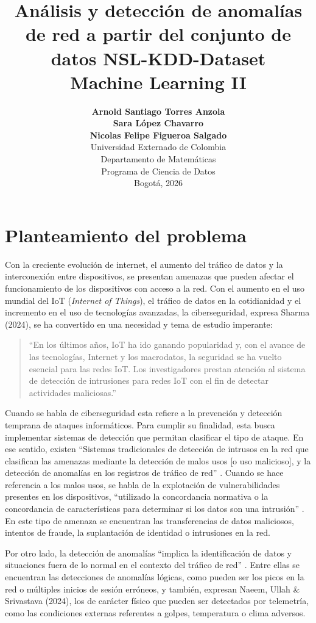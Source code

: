 \documentclass[12pt,a4paper]{article}
\title{\textbf{\Large Análisis y detección de anomalías de red a partir del conjunto de datos NSL-KDD-Dataset} \\
\vspace{0.3cm}
\large Machine Learning II}
\author{
    \textbf{Arnold Santiago Torres Anzola} \\
    \textbf{Sara López Chavarro} \\
    \textbf{Nicolas Felipe Figueroa Salgado} \\[0.4cm]
    \small Universidad Externado de Colombia \\
    \small Departamento de Matemáticas \\
    \small Programa de Ciencia de Datos \\
    \small Bogotá, 2026
}
\date{}
\begin{document}
\maketitle

\vspace{0.5cm}

\section{Planteamiento del problema}

Con la creciente evolución de internet, el aumento del tráfico de datos y la interconexión entre dispositivos, se presentan amenazas que pueden afectar el funcionamiento de los dispositivos con acceso a la red. Con el aumento en el uso mundial del IoT (\textit{Internet of Things}), el tráfico de datos en la cotidianidad y el incremento en el uso de tecnologías avanzadas, la ciberseguridad, expresa Sharma (2024), se ha convertido en una necesidad y tema de estudio imperante:

\begin{quote}
``En los últimos años, IoT ha ido ganando popularidad y, con el avance de las tecnologías, Internet y los macrodatos, la seguridad se ha vuelto esencial para las redes IoT. Los investigadores prestan atención al sistema de detección de intrusiones para redes IoT con el fin de detectar actividades maliciosas.'' \cite[pág.~1]{sharma2024explainable}
\end{quote}

Cuando se habla de ciberseguridad esta refiere a la prevención y detección temprana de ataques informáticos. Para cumplir su finalidad, esta busca implementar sistemas de detección que permitan clasificar el tipo de ataque. En ese sentido, existen ``Sistemas tradicionales de detección de intrusos en la red que clasifican las amenazas mediante la detección de malos usos [o uso malicioso], y la detección de anomalías en los registros de tráfico de red'' \cite[pág.~191]{ullah2024ids}. Cuando se hace referencia a los malos usos, se habla de la explotación de vulnerabilidades presentes en los dispositivos, ``utilizado la concordancia normativa o la concordancia de características para determinar si los datos son una intrusión'' \cite[pág.~191]{ullah2024ids}. En este tipo de amenaza se encuentran las transferencias de datos maliciosos, intentos de fraude, la suplantación de identidad o intrusiones en la red.

Por otro lado, la detección de anomalías ``implica la identificación de datos y situaciones fuera de lo normal en el contexto del tráfico de red'' \cite[pág.~191]{ullah2024ids}. Entre ellas se encuentran las detecciones de anomalías lógicas, como pueden ser los picos en la red o múltiples inicios de sesión erróneos, y también, expresan Naeem, Ullah \& Srivastava (2024), los de carácter físico que pueden ser detectados por telemetría, como las condiciones externas referentes a golpes, temperatura o clima adversos.
\end{document}
